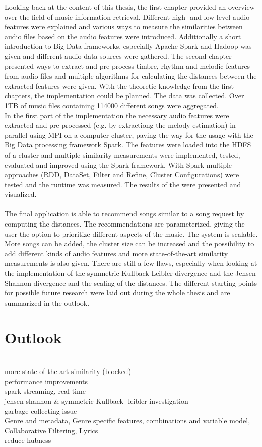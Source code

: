 Looking back at the content of this thesis, the first chapter provided an overview over the field of music information retrieval. Different high- and low-level audio features were explained and various ways to measure the similarities between audio files based on the audio features were introduced. Additionally a short introduction to Big Data frameworks, especially Apache Spark and Hadoop was given and different audio data sources were gathered. The second chapter presented ways to extract and pre-process timbre, rhythm and melodic features from audio files and multiple algorithms for calculating the distances between the extracted features were given. With the theoretic knowledge from the first chapters, the implementation could be planned. The data was collected. Over 1TB of music files containing 114000 different songs were aggregated.\\ 
In the first part of the implementation the necessary audio features were extracted and pre-processed (e.g. by extractiong the melody estimation) in parallel using MPI on a computer cluster, paving the way for the usage with the Big Data processing framework Spark.
The features were loaded into the HDFS of a cluster and multiple similarity measurements were implemented, tested, evaluated and improved using the Spark framework. With Spark multiple approaches (RDD, DataSet, Filter and Refine, Cluster Configurations) were tested and the runtime was measured. The results of the were presented and visualized.\\
\ \\
The final application is able to recommend songs similar to a song request by computing the distances. The recommendations are parameterized, giving the user the option to prioritize different aspects of the music. The system is scalable. More songs can be added, the cluster size can be increased and the possibility to add different kinds of audio features and more state-of-the-art similarity measurements is also given. There are still a few flaws, especially when looking at the implementation of the symmetric Kullback-Leibler divergence and the Jensen-Shannon divergence and the scaling of the distances. The different starting points for possible future research were laid out during the whole thesis and are summarized in the outlook. 

\section{Outlook}
\ \\
more state of the art similarity (blocked)\\
performance improvements\\
spark streaming, real-time\\
jensen-shannon \& symmetric Kullback- leibler investigation\\
garbage collecting issue\\
Genre and metadata, Genre specific features, combinations and variable model, Collaborative Filtering, Lyrics\\
reduce hubness\\

